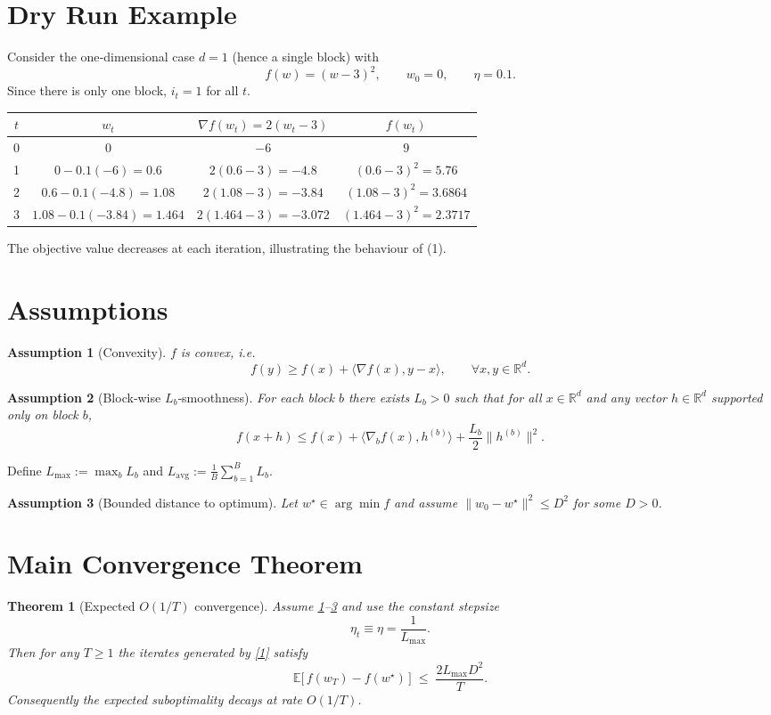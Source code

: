 \documentclass{article}
\newtheorem{theorem}{Theorem}
\newtheorem{assumption}{Assumption}
\newcommand{\E}{\mathbb{E}}
\newcommand{\R}{\mathbb{R}}
\begin{document}
\section*{Dry Run Example}
Consider the one‑dimensional case $d=1$ (hence a single block) with
\[
f(w)=(w-3)^{2},\qquad w_{0}=0,\qquad \eta=0.1 .
\]
Since there is only one block, $i_{t}=1$ for all $t$.

\begin{tabular}{c|c|c|c}
$t$ & $w_{t}$ & $\nabla f(w_{t})=2(w_{t}-3)$ & $f(w_{t})$\\ \hline
0 & $0$ & $-6$ & $9$\\
1 & $0-0.1(-6)=0.6$ & $2(0.6-3)=-4.8$ & $(0.6-3)^{2}=5.76$\\
2 & $0.6-0.1(-4.8)=1.08$ & $2(1.08-3)=-3.84$ & $(1.08-3)^{2}=3.6864$\\
3 & $1.08-0.1(-3.84)=1.464$ & $2(1.464-3)=-3.072$ & $(1.464-3)^{2}=2.3717$
\end{tabular}

The objective value decreases at each iteration, illustrating the behaviour of (1).

\newpage

\section*{Assumptions}
\begin{assumption}[Convexity]\label{ass:convex}
$f$ is convex, i.e.
\[
f(y)\ge f(x)+\langle \nabla f(x),y-x\rangle,\qquad \forall x,y\in\R^{d}.
\]
\end{assumption}
\begin{assumption}[Block‑wise $L_{b}$‑smoothness]\label{ass:smooth}
For each block $b$ there exists $L_{b}>0$ such that for all $x\in\R^{d}$ and any
vector $h\in\R^{d}$ supported only on block $b$,
\[
f(x+h)\le f(x)+\langle \nabla_{b}f(x),h^{(b)}\rangle+\frac{L_{b}}{2}\|h^{(b)}\|^{2}.
\]
\end{assumption}
Define $L_{\max}:=\max_{b}L_{b}$ and $L_{\mathrm{avg}}:=\frac{1}{B}\sum_{b=1}^{B}L_{b}$.

\begin{assumption}[Bounded distance to optimum]\label{ass:bound}
Let $w^{\star}\in\arg\min f$ and assume $\|w_{0}-w^{\star}\|^{2}\le D^{2}$ for some $D>0$.
\end{assumption}

\section*{Main Convergence Theorem}
\begin{theorem}[Expected $O(1/T)$ convergence]\label{thm:conv}
Assume \ref{ass:convex}--\ref{ass:bound} and use the constant stepsize
\[
\eta_{t}\equiv \eta=\frac{1}{L_{\max}}.
\]
Then for any $T\ge 1$ the iterates generated by \eqref{1} satisfy
\[
\E\!\big[\,f(w_{T})-f(w^{\star})\,\big]\;\le\;
\frac{2L_{\max}D^{2}}{T}.
\tag{2}
\]
Consequently the expected suboptimality decays at rate $O(1/T)$.
\end{theorem}
\end{document}
